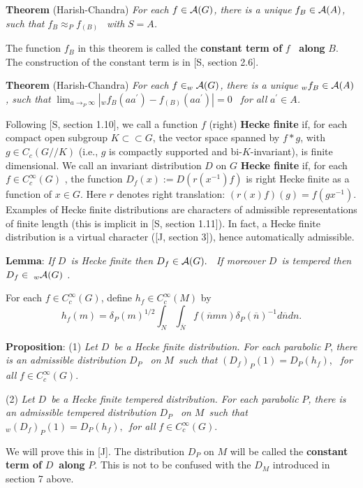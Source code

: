 {\bf Theorem} (Harish-Chandra) {\em For each }$f\in {\cal A}(G)${\em , there
is a unique }$f_B\in {\cal A}(A)${\em , such that }$f_B\approx _Pf_{(B)}$%
{\em \ with }$S=A${\em .}

The function $f_B$ in this theorem is called the {\bf constant term of }$f$%
{\bf \ along }$B$. The construction of the constant term is in [S, section
2.6].

{\bf Theorem} (Harish-Chandra) {\em For each }$f\in _w{\cal A}(G)${\em ,
there is a unique }$_wf_B\in {\cal A}(A)${\em , such that }$\lim
_{a\rightarrow _P\infty }|_wf_B(aa^{\prime })-f_{(B)}(aa^{\prime })|=0${\em %
\ for all }$a^{\prime }\in A${\em .}

Following [S, section 1.10], we call a function $f$ (right) {\bf Hecke finite%
} if, for each compact open subgroup $K\subset \subset G$, the vector space
spanned by $f*g$, with $g\in C_c(G//K)$ (i.e., $g$ is compactly supported
and bi-$K$-invariant), is finite dimensional. We call an invariant
distribution $D$ on $G$ {\bf Hecke finite} if, for each $f\in C_c^\infty (G)$%
, the function $D_f(x):=D(r(x^{-1})f)$ is right Hecke finite as a function
of $x\in G$. Here $r$ denotes right translation: $(r(x)f)(g)=f(gx^{-1}).$
Examples of Hecke finite distributions are characters of admissible
representations of finite length (this is implicit in [S, section 1.11]). In
fact, a Hecke finite distribution is a virtual character ([J, section 3]),
hence automatically admissible.

{\bf Lemma}: {\em If }$D${\em \ is Hecke finite then }$D_f\in {\cal A}(G).$%
{\em \ If moreover }$D${\em \ is tempered then }$D_f\in \;_w{\cal A}(G)${\em %
.}

For each $f\in C_c^\infty (G)$, define $h_f\in C_c^\infty (M)$ by 
\[
h_f(m)=\delta _P(m)^{1/2}\int_N\int_{\overline{N}}f(\overline{n}mn)\delta _P(%
\overline{n})^{-1}d\overline{n}dn. 
\]

{\bf Proposition}: (1) {\em Let }$D${\em \ be a Hecke finite distribution.
For each parabolic }$P$, {\em there is an admissible distribution }$D_P${\em %
\ on }$M${\em \ such that } $(D_f)_P(1)=D_P(h_f)$, {\em \ for all }$f\in
C_c^\infty (G).$

(2) {\em Let }$D${\em \ be a Hecke finite tempered distribution. For each
parabolic }$P${\em , there is an admissible tempered distribution }$D_P${\em %
\ on }$M${\em \ such that }$_w(D_f)_P(1)=D_P(h_f),${\em \ for all }$f\in
C_c^\infty (G).$

We will prove this in [J]. The distribution $D_P$ on $M$ will be called the 
{\bf constant term of }$D${\bf \ along }$P$. This is not to be confused with
the $D_M$ introduced in section 7 above.

